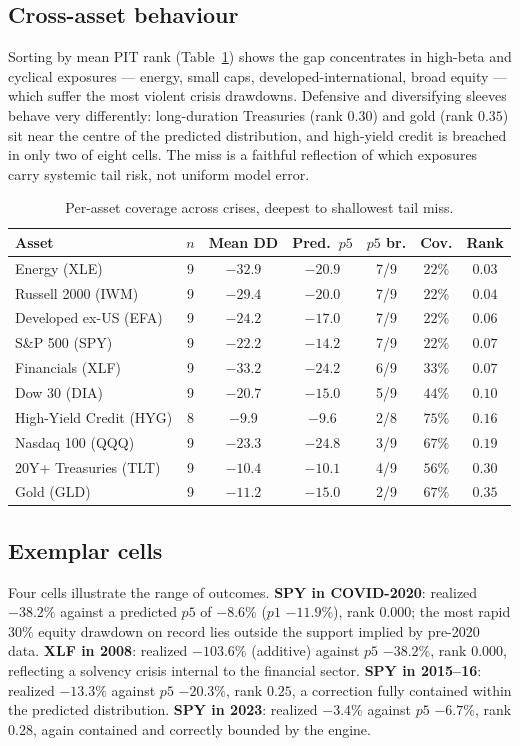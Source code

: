 \documentclass[11pt]{article}
\theoremstyle{definition}
\begin{document}
\subsection{Cross-asset behaviour}
Sorting by mean PIT rank (Table~\ref{tab:assets}) shows the gap concentrates in
high-beta and cyclical exposures --- energy, small caps, developed-international,
broad equity --- which suffer the most violent crisis drawdowns. Defensive and
diversifying sleeves behave very differently: long-duration Treasuries (rank
$0.30$) and gold (rank $0.35$) sit near the centre of the predicted distribution,
and high-yield credit is breached in only two of eight cells. The miss is a
faithful reflection of which exposures carry systemic tail risk, not uniform
model error.

\begin{table}[h]
\centering
\caption{Per-asset coverage across crises, deepest to shallowest tail miss.}
\label{tab:assets}
\begin{tabular}{lcccccc}
\toprule
Asset & $n$ & Mean DD & Pred.\ $p5$ & $p5$ br. & Cov. & Rank \\
\midrule
Energy (XLE)            & 9 & $-32.9$ & $-20.9$ & 7/9 & $22\%$ & $0.03$ \\
Russell 2000 (IWM)      & 9 & $-29.4$ & $-20.0$ & 7/9 & $22\%$ & $0.04$ \\
Developed ex-US (EFA)   & 9 & $-24.2$ & $-17.0$ & 7/9 & $22\%$ & $0.06$ \\
S\&P 500 (SPY)          & 9 & $-22.2$ & $-14.2$ & 7/9 & $22\%$ & $0.07$ \\
Financials (XLF)        & 9 & $-33.2$ & $-24.2$ & 6/9 & $33\%$ & $0.07$ \\
Dow 30 (DIA)            & 9 & $-20.7$ & $-15.0$ & 5/9 & $44\%$ & $0.10$ \\
High-Yield Credit (HYG) & 8 & $-9.9$  & $-9.6$  & 2/8 & $75\%$ & $0.16$ \\
Nasdaq 100 (QQQ)        & 9 & $-23.3$ & $-24.8$ & 3/9 & $67\%$ & $0.19$ \\
20Y+ Treasuries (TLT)   & 9 & $-10.4$ & $-10.1$ & 4/9 & $56\%$ & $0.30$ \\
Gold (GLD)              & 9 & $-11.2$ & $-15.0$ & 2/9 & $67\%$ & $0.35$ \\
\bottomrule
\end{tabular}
\end{table}

\subsection{Exemplar cells}
Four cells illustrate the range of outcomes. \textbf{SPY in COVID-2020}: realized
$-38.2\%$ against a predicted $p5$ of $-8.6\%$ ($p1$ $-11.9\%$), rank $0.000$; the
most rapid $30\%$ equity drawdown on record lies outside the support implied by
pre-2020 data. \textbf{XLF in 2008}: realized $-103.6\%$ (additive) against $p5$
$-38.2\%$, rank $0.000$, reflecting a solvency crisis internal to the financial
sector. \textbf{SPY in 2015--16}: realized $-13.3\%$ against $p5$ $-20.3\%$, rank
$0.25$, a correction fully contained within the predicted distribution.
\textbf{SPY in 2023}: realized $-3.4\%$ against $p5$ $-6.7\%$, rank $0.28$, again
contained and correctly bounded by the engine.
\end{document}
